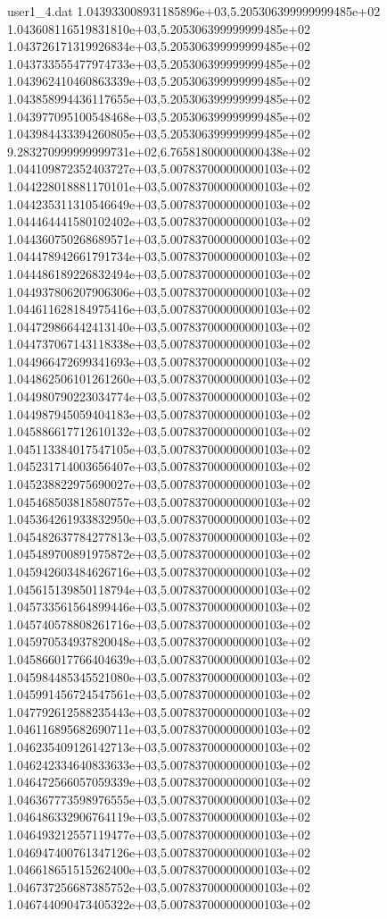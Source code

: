 \begin{filecontents}{user1_4.dat}
1.043933008931185896e+03,5.205306399999999485e+02
1.043608116519831810e+03,5.205306399999999485e+02
1.043726171319926834e+03,5.205306399999999485e+02
1.043733555477974733e+03,5.205306399999999485e+02
1.043962410460863339e+03,5.205306399999999485e+02
1.043858994436117655e+03,5.205306399999999485e+02
1.043977095100548468e+03,5.205306399999999485e+02
1.043984433394260805e+03,5.205306399999999485e+02
9.283270999999999731e+02,6.765818000000000438e+02
1.044109872352403727e+03,5.007837000000000103e+02
1.044228018881170101e+03,5.007837000000000103e+02
1.044235311310546649e+03,5.007837000000000103e+02
1.044464441580102402e+03,5.007837000000000103e+02
1.044360750268689571e+03,5.007837000000000103e+02
1.044478942661791734e+03,5.007837000000000103e+02
1.044486189226832494e+03,5.007837000000000103e+02
1.044937806207906306e+03,5.007837000000000103e+02
1.044611628184975416e+03,5.007837000000000103e+02
1.044729866442413140e+03,5.007837000000000103e+02
1.044737067143118338e+03,5.007837000000000103e+02
1.044966472699341693e+03,5.007837000000000103e+02
1.044862506101261260e+03,5.007837000000000103e+02
1.044980790223034774e+03,5.007837000000000103e+02
1.044987945059404183e+03,5.007837000000000103e+02
1.045886617712610132e+03,5.007837000000000103e+02
1.045113384017547105e+03,5.007837000000000103e+02
1.045231714003656407e+03,5.007837000000000103e+02
1.045238822975690027e+03,5.007837000000000103e+02
1.045468503818580757e+03,5.007837000000000103e+02
1.045364261933832950e+03,5.007837000000000103e+02
1.045482637784277813e+03,5.007837000000000103e+02
1.045489700891975872e+03,5.007837000000000103e+02
1.045942603484626716e+03,5.007837000000000103e+02
1.045615139850118794e+03,5.007837000000000103e+02
1.045733561564899446e+03,5.007837000000000103e+02
1.045740578808261716e+03,5.007837000000000103e+02
1.045970534937820048e+03,5.007837000000000103e+02
1.045866017766404639e+03,5.007837000000000103e+02
1.045984485345521080e+03,5.007837000000000103e+02
1.045991456724547561e+03,5.007837000000000103e+02
1.047792612588235443e+03,5.007837000000000103e+02
1.046116895682690711e+03,5.007837000000000103e+02
1.046235409126142713e+03,5.007837000000000103e+02
1.046242334640833633e+03,5.007837000000000103e+02
1.046472566057059339e+03,5.007837000000000103e+02
1.046367773598976555e+03,5.007837000000000103e+02
1.046486332906764119e+03,5.007837000000000103e+02
1.046493212557119477e+03,5.007837000000000103e+02
1.046947400761347126e+03,5.007837000000000103e+02
1.046618651515262400e+03,5.007837000000000103e+02
1.046737256687385752e+03,5.007837000000000103e+02
1.046744090473405322e+03,5.007837000000000103e+02

\end{filecontents}
